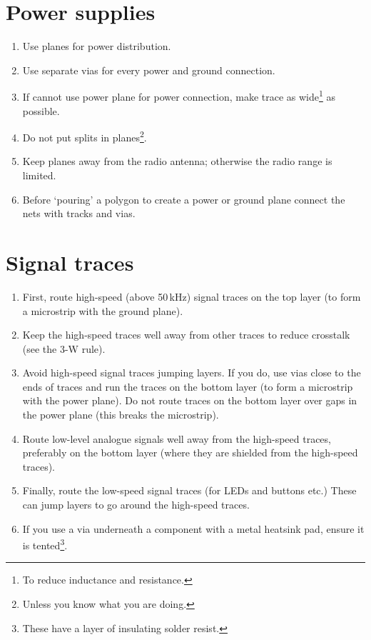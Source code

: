 \section{Power supplies}

\begin{enumerate}

\item Use planes for power distribution.

\item Use separate vias for every power and ground connection.

\item If cannot use power plane for power connection, make trace as
  wide\footnote{To reduce inductance and resistance.} as possible.

\item Do not put splits in planes\footnote{Unless you know what you
  are doing.}.

\item Keep planes away from the radio antenna; otherwise the radio
  range is limited.

\item Before `pouring' a polygon to create a power or ground plane
  connect the nets with tracks and vias.
\end{enumerate}


\section{Signal traces}

\begin{enumerate}

\item First, route high-speed (above 50\,kHz) signal traces on the top
  layer (to form a microstrip with the ground plane).

\item Keep the high-speed traces well away from other traces to reduce
  crosstalk (see the 3-W rule).

\item Avoid high-speed signal traces jumping layers.  If you do, use
  vias close to the ends of traces and run the traces on the bottom
  layer (to form a microstrip with the power plane).  Do not route
  traces on the bottom layer over gaps in the power plane (this breaks
  the microstrip).

\item Route low-level analogue signals well away from the high-speed
  traces, preferably on the bottom layer (where they are shielded from
  the high-speed traces).

\item Finally, route the low-speed signal traces (for LEDs and buttons
  etc.)  These can jump layers to go around the high-speed traces.

\item If you use a via underneath a component with a metal heatsink
  pad, ensure it is tented\footnote{These have a layer of insulating
    solder resist.}.
\end{enumerate}


